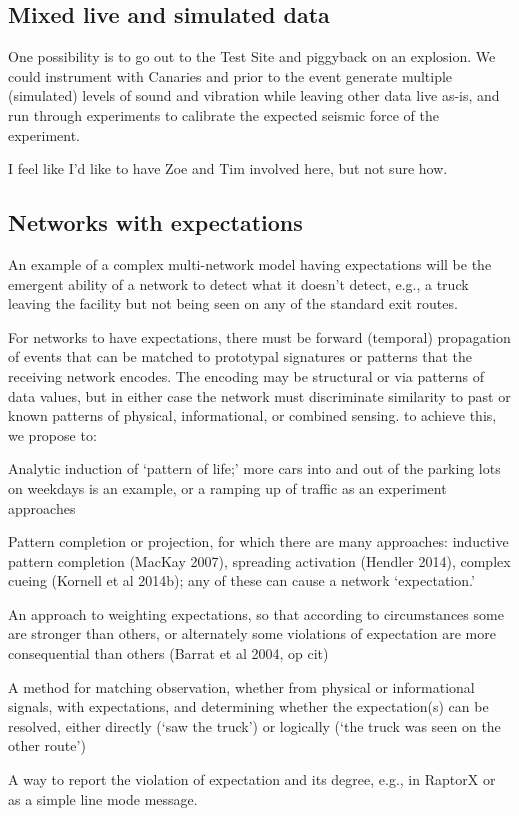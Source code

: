 \documentclass{article} %
\begin{document}
\subsection{Mixed live and simulated data}
One possibility is to go out to the Test Site and piggyback on an explosion. We could instrument with Canaries and prior to the event generate multiple (simulated) levels of sound and vibration while leaving other data live as-is, and run through experiments to calibrate the expected seismic force of the experiment. 

I feel like I'd like to have Zoe and Tim involved here, but not sure how.

\subsection{Networks with expectations}
An example of a complex multi-network model having expectations will be the emergent ability of a network to detect what it doesn't detect, e.g., a truck leaving the facility but not being seen on any of the standard exit routes. 

For networks to have expectations, there must be forward (temporal) propagation of events that can be matched to prototypal signatures or patterns that the receiving network encodes. The encoding may be structural or via patterns of data values, but in either case the network must discriminate similarity to past or known patterns of physical, informational, or combined sensing. to achieve this, we propose to:

\begin{enumerate*}
\item Analytic induction of `pattern of life;' more cars into and out of the parking lots on weekdays is an example, or a ramping up of traffic as an experiment approaches
\item Pattern completion or projection, for which there are many approaches: inductive pattern completion (MacKay 2007), spreading activation (Hendler 2014), complex cueing (Kornell et al 2014b); any of these can cause a network `expectation.'
\item An approach to weighting expectations, so that according to circumstances some are stronger than others, or alternately some violations of expectation are more consequential than others (Barrat et al 2004, op cit)
\item A method for matching observation, whether from physical or informational signals, with expectations, and determining whether the expectation(s) can be resolved, either directly (`saw the truck') or logically (`the truck was seen on the other route')
\item A way to report the violation of expectation and its degree, e.g., in RaptorX or as a simple line mode message.
\end{enumerate*}
\end{document}
